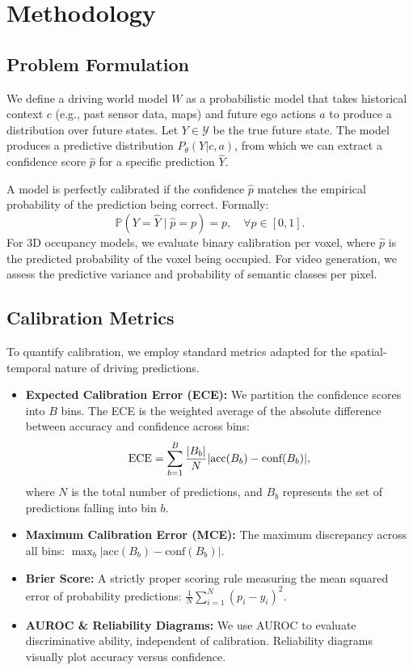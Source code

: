 \section{Methodology}
\label{sec:method}

\subsection{Problem Formulation}
We define a driving world model $W$ as a probabilistic model that takes historical context $c$ (e.g., past sensor data, maps) and future ego actions $a$ to produce a distribution over future states. Let $Y \in \mathcal{Y}$ be the true future state. The model produces a predictive distribution $P_\theta(Y | c, a)$, from which we can extract a confidence score $\hat{p}$ for a specific prediction $\hat{Y}$. 

A model is perfectly calibrated if the confidence $\hat{p}$ matches the empirical probability of the prediction being correct. Formally:
\begin{equation}
\mathbb{P}(Y = \hat{Y} \mid \hat{p} = p) = p, \quad \forall p \in [0, 1].
\end{equation}
For 3D occupancy models, we evaluate binary calibration per voxel, where $\hat{p}$ is the predicted probability of the voxel being occupied. For video generation, we assess the predictive variance and probability of semantic classes per pixel.

\subsection{Calibration Metrics}
To quantify calibration, we employ standard metrics adapted for the spatial-temporal nature of driving predictions.
\begin{itemize}
    \item \textbf{Expected Calibration Error (ECE):} We partition the confidence scores into $B$ bins. The ECE is the weighted average of the absolute difference between accuracy and confidence across bins:
    \begin{equation}
    \text{ECE} = \sum_{b=1}^{B} \frac{|B_b|}{N} |\text{acc}(B_b) - \text{conf}(B_b)|,
    \end{equation}
    where $N$ is the total number of predictions, and $B_b$ represents the set of predictions falling into bin $b$.
    \item \textbf{Maximum Calibration Error (MCE):} The maximum discrepancy across all bins: $\max_b |\text{acc}(B_b) - \text{conf}(B_b)|$.
    \item \textbf{Brier Score:} A strictly proper scoring rule measuring the mean squared error of probability predictions: $\frac{1}{N}\sum_{i=1}^N (p_i - y_i)^2$.
    \item \textbf{AUROC \& Reliability Diagrams:} We use AUROC to evaluate discriminative ability, independent of calibration. Reliability diagrams visually plot accuracy versus confidence.
\end{itemize}

